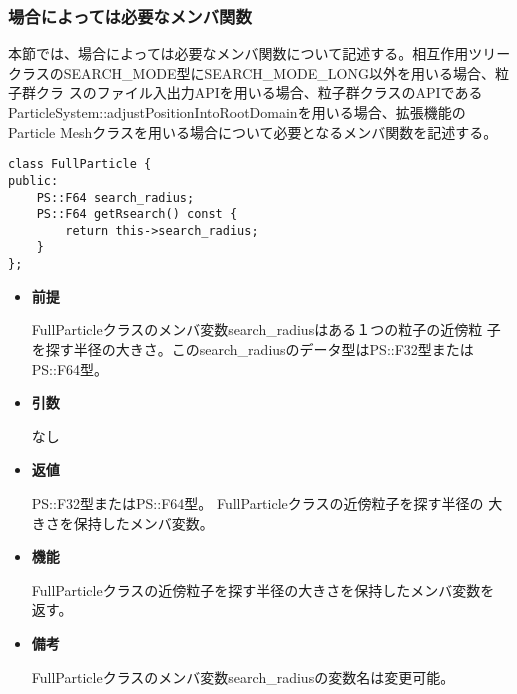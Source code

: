 \subsubsection{場合によっては必要なメンバ関数}


本節では、場合によっては必要なメンバ関数について記述する。相互作用ツリー
クラスのSEARCH\_MODE型にSEARCH\_MODE\_LONG以外を用いる場合、粒子群クラ
スのファイル入出力APIを用いる場合、粒子群クラスのAPIである
ParticleSystem::adjustPositionIntoRootDomainを用いる場合、拡張機能の
Particle Meshクラスを用いる場合について必要となるメンバ関数を記述する。



\begin{screen}
\begin{verbatim}
class FullParticle {
public:
    PS::F64 search_radius;
    PS::F64 getRsearch() const {
        return this->search_radius;
    }
};
\end{verbatim}
\end{screen}

\begin{itemize}

\item {\bf 前提}

  FullParticleクラスのメンバ変数search\_radiusはある１つの粒子の近傍粒
  子を探す半径の大きさ。このsearch\_radiusのデータ型はPS::F32型または
  PS::F64型。
  
\item {\bf 引数}

  なし
  
\item {\bf 返値}

  PS::F32型またはPS::F64型。 FullParticleクラスの近傍粒子を探す半径の
  大きさを保持したメンバ変数。
  
\item {\bf 機能}

  FullParticleクラスの近傍粒子を探す半径の大きさを保持したメンバ変数を
  返す。

\item {\bf 備考}

  FullParticleクラスのメンバ変数search\_radiusの変数名は変更可能。
  
\end{itemize}

